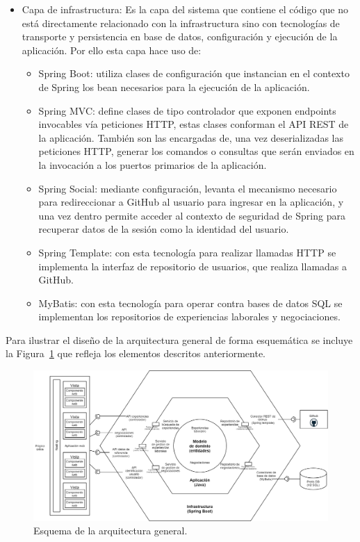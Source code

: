 \documentclass[a4paper, 12pt]{book}
\begin{document}
\begin{itemize}
  \item Capa de infrastructura: Es la capa del sistema que contiene el código que no está directamente relacionado con la infrastructura sino con tecnologías de transporte y persistencia en base de datos, configuración y ejecución de la aplicación.
Por ello esta capa hace uso de:

	\begin{itemize}
	\item Spring Boot: utiliza clases de configuración que instancian en el contexto de Spring los bean necesarios para la ejecución de la aplicación.
	\item Spring MVC: define clases de tipo controlador que exponen endpoints invocables vía peticiones HTTP, estas clases conforman el API REST de la aplicación. También son las encargadas de, una vez deserializadas las peticiones HTTP, generar los comandos o consultas que serán enviados en la invocación a los puertos primarios de la aplicación.
	\item Spring Social: mediante configuración, levanta el mecanismo necesario para redireccionar a GitHub al usuario para ingresar en la aplicación, y una vez dentro permite acceder al contexto de seguridad de Spring para recuperar datos de la sesión como la identidad del usuario.
	\item Spring Template: con esta tecnología para realizar llamadas HTTP se implementa la interfaz de repositorio de usuarios, que realiza llamadas a GitHub.
	\item MyBatis: con esta tecnología para operar contra bases de datos SQL se implementan los repositorios de experiencias laborales y negociaciones.
	\end{itemize}

\end{itemize}


Para ilustrar el diseño de la arquitectura general de forma esquemática se incluye la Figura~\ref{fig:general_architecture} que refleja los elementos descritos anteriormente.

\begin{figure}
  \centering
  \includegraphics[width=15cm, keepaspectratio]{img/Arquitectura_hexagonal.png}
  \caption{Esquema de la arquitectura general.}\label{fig:general_architecture}
\end{figure}
\end{document}
